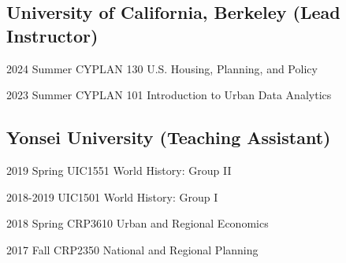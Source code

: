 \documentclass[12pt,letterpaper]{report}
\begin{document}
    \subsection*{University of California, Berkeley (Lead Instructor)}
    \begin{tablist}
        \item[2024 Summer] \tab{}CYPLAN 130 U.S. Housing, Planning, and Policy
        \item[2023 Summer] \tab{}CYPLAN 101 Introduction to Urban Data Analytics
    \end{tablist}
    \subsection*{Yonsei University (Teaching Assistant)}
    \begin{tablist}
      \item[2019 Spring] \tab{}UIC1551 World History: Group II
      \item[2018-2019] \tab{}UIC1501 World History: Group I 
      \item[2018 Spring] \tab{}CRP3610 Urban and Regional Economics
      \item[2017 Fall] \tab{}CRP2350 National and Regional Planning
    \end{tablist}

  
\end{document}
